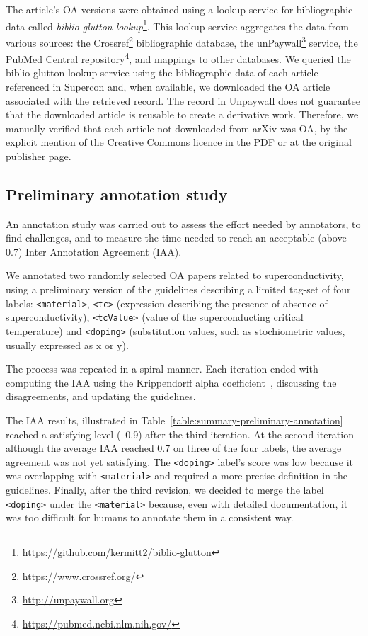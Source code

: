 \documentclass[fleqn,10pt]{wlscirep}
\begin{document}
The article's OA versions were obtained using a lookup service for bibliographic data called \textit{biblio-glutton lookup}\footnote{\url{https://github.com/kermitt2/biblio-glutton}}. This lookup service aggregates the data from various sources: the Crossref\footnote{\url{https://www.crossref.org/}} bibliographic database, the unPaywall\footnote{\url{http://unpaywall.org}} service, the PubMed Central repository\footnote{\url{https://pubmed.ncbi.nlm.nih.gov/}}, and mappings to other databases. 
We queried the biblio-glutton lookup service using the bibliographic data of each article referenced in Supercon and, when available, we downloaded the OA article associated with the retrieved record. 
The record in Unpaywall does not guarantee that the downloaded article is reusable to create a derivative work. Therefore, we manually verified that each article not downloaded from arXiv was OA, by the explicit mention of the Creative Commons licence in the PDF or at the original publisher page. 

\subsection*{Preliminary annotation study}
\label{subsec:preliminary-annotation-study}
An annotation study was carried out to assess the effort needed by annotators, to find challenges, and to measure the time needed to reach an acceptable (above 0.7) Inter Annotation Agreement (IAA).

We annotated two randomly selected OA papers related to superconductivity, using a preliminary version of the guidelines describing a limited tag-set of four labels: \texttt{<material>}, \texttt{<tc>} (expression describing the presence of absence of superconductivity), \texttt{<tcValue>} (value of the superconducting critical temperature) and \texttt{<doping>} (substitution values, such as stochiometric values, usually expressed as x or y).

The process was repeated in a spiral manner. 
Each iteration ended with computing the IAA using the Krippendorff alpha coefficient~\cite{Krippendorff2004ReliabilityIC,Zapf2016MeasuringIR}, discussing the disagreements, and updating the guidelines.

The IAA results, illustrated in Table~\ref{table:summary-preliminary-annotation} reached a satisfying level (~0.9) after the third iteration. 
At the second iteration although the average IAA reached 0.7 on three of the four labels, the average agreement was not yet satisfying. 
The \texttt{<doping>} label's score was low because it was overlapping with \texttt{<material>} and required a more precise definition in the guidelines. 
Finally, after the third revision, we decided to merge the label \texttt{<doping>} under the \texttt{<material>} because, even with detailed documentation, it was too difficult for humans to annotate them in a consistent way.
\end{document}
